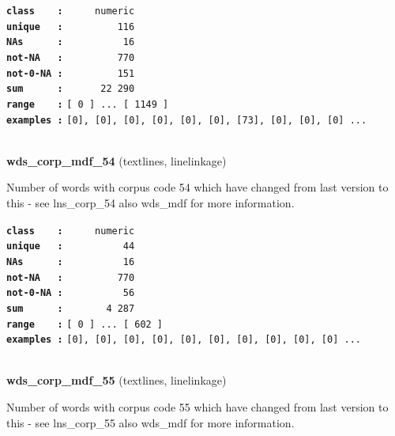 \documentclass[]{article}
\begin{document}
\textbf{\texttt{class\ \ \ \ :}} \texttt{~~~~~numeric}\\
\textbf{\texttt{unique\ \ \ :}} \texttt{~~~~~~~~~116}\\
\textbf{\texttt{NAs\ \ \ \ \ \ :}} \texttt{~~~~~~~~~~16}\\
\textbf{\texttt{not-NA\ \ \ :}} \texttt{~~~~~~~~~770}\\
\textbf{\texttt{not-0-NA\ :}} \texttt{~~~~~~~~~151}\\
\textbf{\texttt{sum\ \ \ \ \ \ :}} \texttt{~~~~~~22~290}\\
\textbf{\texttt{range\ \ \ \ :}}
\texttt{{[}\ 0\ {]}\ ...\ {[}\ 1149\ {]}}\\
\textbf{\texttt{examples\ :}}
\texttt{{[}0{]},\ {[}0{]},\ {[}0{]},\ {[}0{]},\ {[}0{]},\ {[}0{]},\ {[}73{]},\ {[}0{]},\ {[}0{]},\ {[}0{]}\ ...}\\

~

\textbf{wds\_corp\_mdf\_54} (textlines, linelinkage)

Number of words with corpus code 54 which have changed from last version
to this - see lns\_corp\_54 also wds\_mdf for more information.

\textbf{\texttt{class\ \ \ \ :}} \texttt{~~~~~numeric}\\
\textbf{\texttt{unique\ \ \ :}} \texttt{~~~~~~~~~~44}\\
\textbf{\texttt{NAs\ \ \ \ \ \ :}} \texttt{~~~~~~~~~~16}\\
\textbf{\texttt{not-NA\ \ \ :}} \texttt{~~~~~~~~~770}\\
\textbf{\texttt{not-0-NA\ :}} \texttt{~~~~~~~~~~56}\\
\textbf{\texttt{sum\ \ \ \ \ \ :}} \texttt{~~~~~~~4~287}\\
\textbf{\texttt{range\ \ \ \ :}}
\texttt{{[}\ 0\ {]}\ ...\ {[}\ 602\ {]}}\\
\textbf{\texttt{examples\ :}}
\texttt{{[}0{]},\ {[}0{]},\ {[}0{]},\ {[}0{]},\ {[}0{]},\ {[}0{]},\ {[}0{]},\ {[}0{]},\ {[}0{]},\ {[}0{]}\ ...}\\

~

\textbf{wds\_corp\_mdf\_55} (textlines, linelinkage)

Number of words with corpus code 55 which have changed from last version
to this - see lns\_corp\_55 also wds\_mdf for more information.
\end{document}
